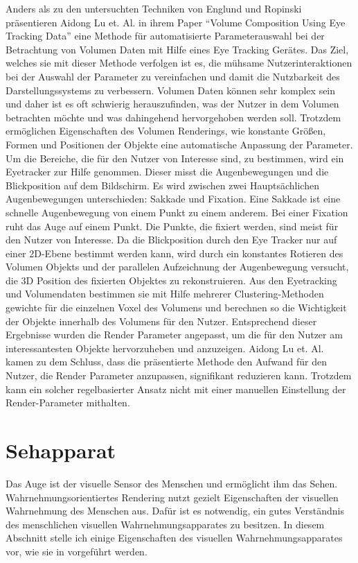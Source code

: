 Anders als zu den untersuchten Techniken von Englund und Ropinski \cite{doi:10.1111/cgf.13320} präsentieren Aidong Lu et. Al. in ihrem Paper \enquote{Volume Composition Using Eye Tracking Data} \cite{Lu:2006:VCU:2384796.2384814} eine Methode für automatisierte Parameterauswahl bei der Betrachtung von Volumen Daten mit Hilfe eines Eye Tracking Gerätes.
Das Ziel, welches sie mit dieser Methode verfolgen ist es, die mühsame Nutzerinteraktionen bei der Auswahl der Parameter zu vereinfachen und damit die Nutzbarkeit des Darstellungssystems zu verbessern.
Volumen Daten können sehr komplex sein und daher ist es oft schwierig herauszufinden, was der Nutzer in dem Volumen betrachten möchte und was dahingehend hervorgehoben werden soll.
Trotzdem ermöglichen Eigenschaften des Volumen Renderings, wie konstante Größen, Formen und Positionen der Objekte eine automatische Anpassung der Parameter.
Um die Bereiche, die für den Nutzer von Interesse sind, zu bestimmen, wird ein Eyetracker zur Hilfe genommen.
Dieser misst die Augenbewegungen und die Blickposition auf dem Bildschirm.
Es wird zwischen zwei Hauptsächlichen Augenbewegungen unterschieden: Sakkade und Fixation.
Eine Sakkade ist eine schnelle Augenbewegung von einem Punkt zu einem anderem.
Bei einer Fixation ruht das Auge auf einem Punkt.
Die Punkte, die fixiert werden, sind meist für den Nutzer von Interesse.
Da die Blickposition durch den Eye Tracker nur auf einer 2D-Ebene bestimmt werden kann, wird durch ein konstantes Rotieren des Volumen Objekts und der parallelen Aufzeichnung der Augenbewegung versucht, die 3D Position des fixierten Objektes zu rekonstruieren.
Aus den Eyetracking und Volumendaten bestimmen sie mit Hilfe mehrerer Clustering-Methoden gewichte für die einzelnen Voxel des Volumens und berechnen so die Wichtigkeit der Objekte innerhalb des Volumens für den Nutzer.
Entsprechend dieser Ergebnisse wurden die Render Parameter angepasst, um die für den Nutzer am interessantesten Objekte hervorzuheben und anzuzeigen.
Aidong Lu et. Al. kamen zu dem Schluss, dass die präsentierte Methode den Aufwand für den Nutzer, die Render Parameter anzupassen, signifikant reduzieren kann.
Trotzdem kann ein solcher regelbasierter Ansatz nicht mit einer manuellen Einstellung der Render-Parameter mithalten.


\section{Sehapparat}\label{sec::eye}
Das Auge ist der visuelle Sensor des Menschen und ermöglicht ihm das Sehen.
Wahrnehmungsorientiertes Rendering nutzt gezielt Eigenschaften der visuellen Wahrnehmung des Menschen aus.
Dafür ist es notwendig, ein gutes Verständnis des menschlichen visuellen Wahrnehmungsapparates zu besitzen.
In diesem Abschnitt stelle ich einige Eigenschaften des visuellen Wahrnehmungsapparates vor, wie sie in \cite{doi:10.1111/cgf.13150} vorgeführt werden.

